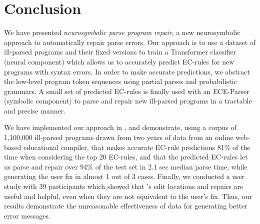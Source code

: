 \section{Conclusion}
\label{sec:conclusion}

We have presented \emph{neurosymbolic parse program repair}, a new neurosymbolic
approach to automatically repair parse errors.
%
Our approach is to use a dataset of ill-parsed programs and their fixed versions
to train a Transformer classifier (neural component) which allows us to
accurately predict EC-rules for new programs with syntax errors. In order to
make accurate predictions, we abstract the low-level program token sequences
using partial parses and probabilistic grammars. A small set of predicted
EC-rules is finally used with an ECE-Parser (symbolic component) to parse and
repair new ill-parsed programs in a tractable and precise manner.

We have implemented our approach in \toolname, and demonstrate, using a corpus
of 1,100,000 ill-parsed \python programs drawn from two years of data from an
online web-based educational compiler, that \toolname makes accurate EC-rule
predictions 81\% of the time when considering the top 20 EC-rules, and that the
predicted EC-rules let us parse and repair over 94\% of the test set in 2.1 sec
median parse time, while generating the user fix in almost 1 out of 3 cases.
%
Finally, we conducted a user study with 39 participants which showed that
\toolname's edit locations and repairs are useful and helpful, even when they
are not equivalent to the user's fix.
%
Thus, our results demonstrate the unreasonable effectiveness
of data for generating better error messages.
